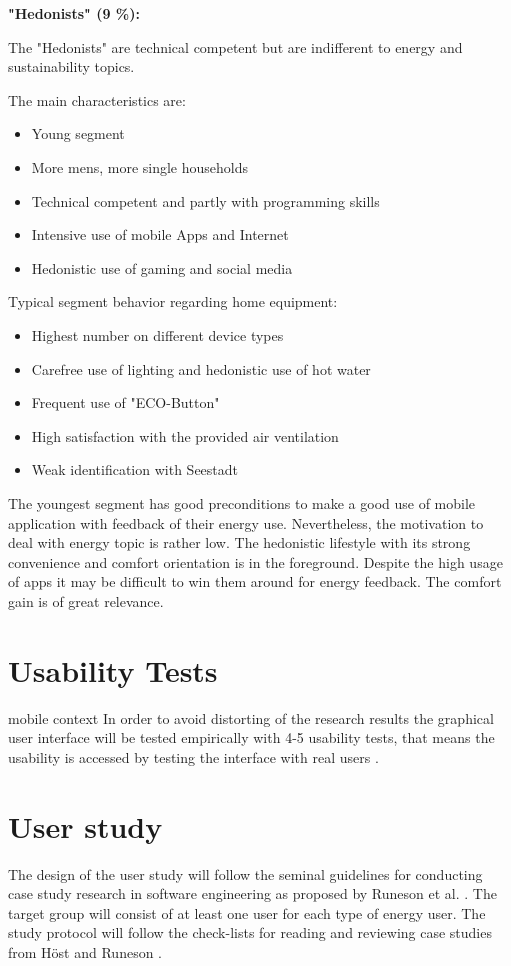 \textbf{"Hedonists" (9 \%):}

The "Hedonists" are technical competent but are indifferent to energy and sustainability topics.

The main characteristics are:
\begin{itemize}
	\item Young segment
	\item More mens, more single households
	\item Technical competent and partly with programming skills
	\item Intensive use of mobile Apps and Internet
	\item Hedonistic use of gaming and social media
\end{itemize}

Typical segment behavior regarding home equipment:
\begin{itemize}
	\item Highest number on different device types
	\item Carefree use of lighting and hedonistic use of hot water
	\item Frequent use of "ECO-Button"
	\item High satisfaction with the provided air ventilation
	\item Weak identification with Seestadt
\end{itemize}

The youngest segment has good preconditions to make a good use of mobile application with feedback of their energy use. Nevertheless, the motivation to deal with energy topic is rather low. The hedonistic lifestyle with its strong convenience and comfort orientation is in the foreground. Despite the high usage of apps it may be difficult to win them around for energy feedback. The comfort gain is of great relevance.

\section{Usability Tests} mobile context
In order to avoid distorting of the research results the graphical user interface will be tested empirically with 4-5 usability tests, that means the usability is accessed by testing the interface with real users \cite{nielsen1994usability}.

\section{User study}
The design of the user study will follow the seminal guidelines for conducting case study research in software engineering as proposed by Runeson et al. \cite{runeson2012case}. The target group will consist of at least one user for each type of energy user. The study protocol will follow the check-lists for reading and reviewing case studies from H\"ost and Runeson \cite{host2007checklists}.

